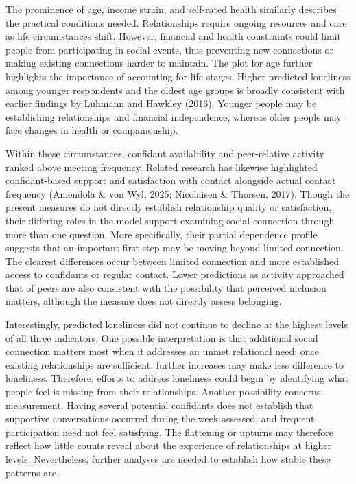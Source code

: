 \documentclass[12pt]{article}
\begin{document}
The prominence of age, income strain, and self-rated health similarly describes the
practical conditions needed. Relationships require ongoing resources and care as life
circumstances shift. However, financial and health constraints could limit people from
participating in social events, thus preventing new connections or making existing
connections harder to maintain. The plot for age further highlights the importance of
accounting for life stages. Higher predicted loneliness among younger respondents and
the oldest age groups is broadly consistent with earlier findings by Luhmann and Hawkley
(2016). Younger people may be establishing relationships and financial independence,
whereas older people may face changes in health or companionship.

Within those circumstances, confidant availability and peer-relative activity ranked
above meeting frequency. Related research has likewise highlighted confidant-based
support and satisfaction with contact alongside actual contact frequency (Amendola \&
von Wyl, 2025; Nicolaisen \& Thorsen, 2017). Though the present measures do not directly
establish relationship quality or satisfaction, their differing roles in the model
support examining social connection through more than one question. More specifically,
their partial dependence profile suggests that an important first step may be moving
beyond limited connection. The clearest differences occur between limited connection
and more established access to confidants or regular contact. Lower predictions as
activity approached that of peers are also consistent with the possibility that
perceived inclusion matters, although the measure does not directly assess belonging.

Interestingly, predicted loneliness did not continue to decline at the highest levels
of all three indicators. One possible interpretation is that additional social
connection matters most when it addresses an unmet relational need; once existing
relationships are sufficient, further increases may make less difference to loneliness.
Therefore, efforts to address loneliness could begin by identifying what people feel is
missing from their relationships. Another possibility concerns measurement. Having
several potential confidants does not establish that supportive conversations occurred
during the week assessed, and frequent participation need not feel satisfying. The
flattening or upturns may therefore reflect how little counts reveal about the
experience of relationships at higher levels. Nevertheless, further analyses are needed
to establish how stable these patterns are.
\end{document}
